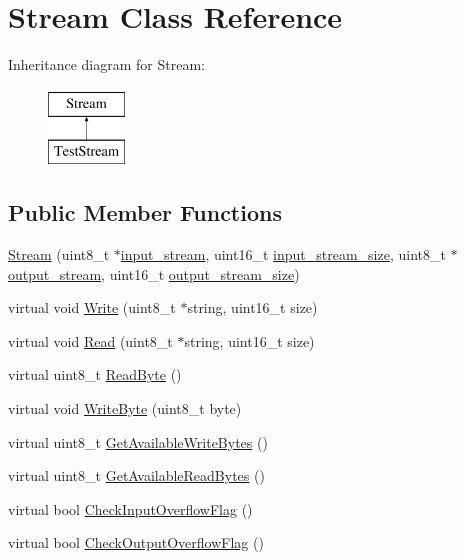 \hypertarget{class_stream}{\section{Stream Class Reference}
\label{class_stream}
}
Inheritance diagram for Stream\-:\begin{figure}[H]
\begin{center}
\leavevmode
\includegraphics[height=2.000000cm]{class_stream}
\end{center}
\end{figure}
\subsection*{Public Member Functions}
\begin{DoxyCompactItemize}
\item 
\hyperlink{class_stream_afd83bbd749c467ad3dd85e1b80170c9b}{Stream} (uint8\-\_\-t $\ast$\hyperlink{class_stream_aaa6b266a85844345faee432d0267c6ec}{input\-\_\-stream}, uint16\-\_\-t \hyperlink{class_stream_a8a754b0acc9552d1b78de92b2476f4cb}{input\-\_\-stream\-\_\-size}, uint8\-\_\-t $\ast$\hyperlink{class_stream_ab2d136f405b24e5eb2a6058b24fabfa3}{output\-\_\-stream}, uint16\-\_\-t \hyperlink{class_stream_a3a171d646ab70eeb9c034aecb3a72003}{output\-\_\-stream\-\_\-size})
\item 
virtual void \hyperlink{class_stream_a508be3423e4d99ab2757275fb723002a}{Write} (uint8\-\_\-t $\ast$string, uint16\-\_\-t size)
\item 
virtual void \hyperlink{class_stream_a4f3ec0f7a24ddcfd054566feb614afba}{Read} (uint8\-\_\-t $\ast$string, uint16\-\_\-t size)
\item 
virtual uint8\-\_\-t \hyperlink{class_stream_aeb3f1b3d55f4b502c02d73ce4de42714}{Read\-Byte} ()
\item 
virtual void \hyperlink{class_stream_aeaed767b3a8d946c6f81465fa83ff17f}{Write\-Byte} (uint8\-\_\-t byte)
\item 
virtual uint8\-\_\-t \hyperlink{class_stream_a6a16ddb03d3360cef4daf4d38245091d}{Get\-Available\-Write\-Bytes} ()
\item 
virtual uint8\-\_\-t \hyperlink{class_stream_a71cec6c46f3d50cc3ab420e93ae434e1}{Get\-Available\-Read\-Bytes} ()
\item 
virtual bool \hyperlink{class_stream_a088c4e68d568acfad715c56f408fe9f8}{Check\-Input\-Overflow\-Flag} ()
\item 
virtual bool \hyperlink{class_stream_aee6c201819b874c5934a270592d9d311}{Check\-Output\-Overflow\-Flag} ()
\end{DoxyCompactItemize}
